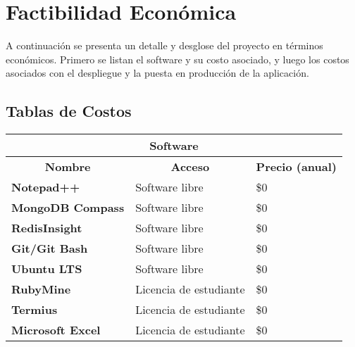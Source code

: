 \section{Factibilidad Económica}
A continuación se presenta un detalle y desglose del proyecto en términos económicos. Primero se listan el software y su costo asociado, y luego los costos asociados con el despliegue y la puesta en producción de la aplicación.

\subsection{Tablas de Costos}

\begin{center}
	\begin{tabular}{ | l | p{5cm} | p{5cm}|}
		\hline
		\multicolumn{3}{|c|}{\textbf{Software}} \\
		\hline
		\multicolumn{1}{|c|}{\textbf{Nombre}} & \multicolumn{1}{|c|}{\textbf{Acceso}} & \multicolumn{1}{|c|}{\textbf{Precio (anual)}} \\
		\hline
		{\textbf{Notepad++}} & Software libre & \$0 \\ \hline

		{\textbf{MongoDB Compass}} & Software libre & \$0 \\ \hline
		
		{\textbf{RedisInsight}} & Software libre & \$0 \\ \hline
		
		{\textbf{Git/Git Bash}} & Software libre & \$0 \\ \hline
		
		{\textbf{Ubuntu LTS}} & Software libre & \$0 \\ \hline
		
		{\textbf{RubyMine}} & Licencia de estudiante & \$0 \\ \hline
		
		{\textbf{Termius}} & Licencia de estudiante & \$0 \\ \hline
		
		{\textbf{Microsoft Excel}} & Licencia de estudiante & \$0 \\ \hline
	\end{tabular}
\end{center}

